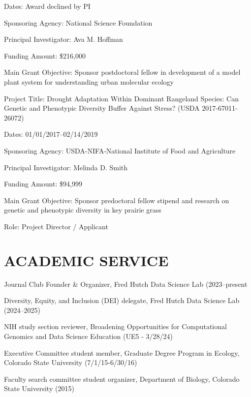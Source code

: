 \documentclass{cv}
\begin{document}
Dates: Award declined by PI

Sponsoring Agency: National Science Foundation

Principal Investigator: Ava M. Hoffman

Funding Amount: \$216,000

Main Grant Objective: Sponsor postdoctoral fellow in development of a model plant system for understanding urban molecular ecology

\vspace{5mm}

Project Title: Drought Adaptation Within Dominant Rangeland Species: Can Genetic and Phenotypic Diversity Buffer Against Stress? (USDA 2017-67011-26072)

Dates: 01/01/2017--02/14/2019

Sponsoring Agency: USDA-NIFA-National Institute of Food and Agriculture

Principal Investigator: Melinda D. Smith

Funding Amount: \$94,999

Main Grant Objective: Sponsor predoctoral fellow stipend and research on genetic and phenotypic diversity in key prairie grass

Role: Project Director / Applicant


\section*{ACADEMIC SERVICE}

Journal Club Founder \& Organizer, Fred Hutch Data Science Lab (2023--present

Diversity, Equity, and Inclusion (DEI) delegate, Fred Hutch Data Science Lab (2024--2025)

NIH study section reviewer, Broadening Opportunities for Computational Genomics and Data Science Education (UE5 - 3/28/24)

Executive Committee student member, Graduate Degree Program in Ecology, Colorado State University (7/1/15-6/30/16)

Faculty search committee student organizer, Department of Biology, Colorado State University (2015)

\end{document}

